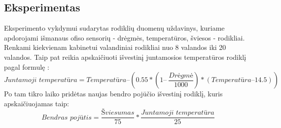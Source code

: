 \documentclass{VUMIFPSbakalaurinis}
\begin{document}
\subsection{Eksperimentas}

Eksperimento vykdymui sudarytas rodiklių duomenų uždavinys, kuriame apdorojami išmanaus ofiso sensorių - drėgmės, temperatūros, šviesos - rodikliai. Renkami kiekvienam kabinetui valandiniai rodikliai nuo 8 valandos iki 20 valandos. Taip pat reikia apskaičiuoti išvestinį juntamosios temperatūros rodiklį pagal formulę \cite{anderson2013methods}: 
\[\textit{Juntamoji temperatūra} = \textit{Temperatūra} – (0.55 * (1 –\>\frac{\textit{Drėgmė}}{1000}) * (\textit{Temperatūra} – 14.5))\]
Po tam tikro laiko pridėtas naujas bendro pojūčio išvestinį rodiklį, kuris apskaičiuojamas taip: 
\[\textit{Bendras pojūtis} = \frac{\textit{Šviesumas}}{75} * \frac{\textit{Juntamoji temperatūra}}{25} \]
\end{document}

